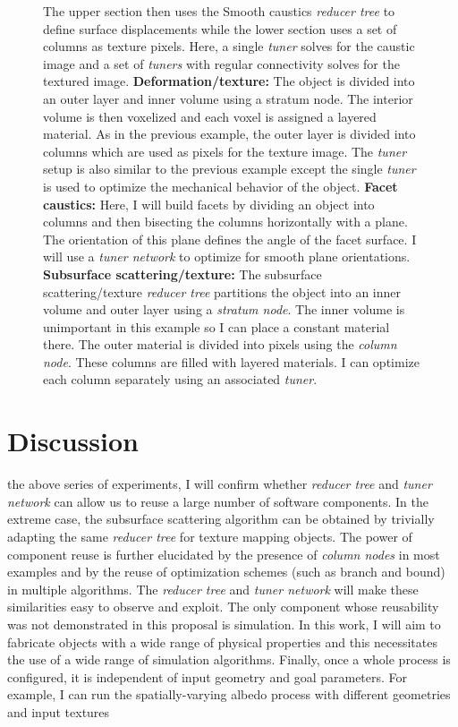 \begin{figure}[t]
{The upper section then uses the Smooth caustics \emph{reducer tree} to define surface displacements while the lower section uses a set of columns as texture pixels.
Here, a single \emph{tuner} solves for the caustic image and a set of \emph{tuners} with regular connectivity solves for the textured image.
\textbf{Deformation/texture:} The object is divided into an outer layer and inner volume using a stratum node.
The interior volume is then voxelized and each voxel is assigned a layered material.
As in the previous example, the outer layer is divided into columns which are used as pixels for the texture image.
The \emph{tuner} setup is also similar to the previous example except the single \emph{tuner} is used to optimize the mechanical behavior of the object.
\textbf{Facet caustics:} Here, I will build facets by dividing an object into columns and then bisecting the columns horizontally with a plane.
The orientation of this plane defines the angle of the facet surface. 
I will use a \emph{tuner network} to optimize for smooth plane orientations.
\textbf{Subsurface scattering/texture:} The subsurface scattering/texture \emph{reducer tree} partitions the object into an inner volume and outer layer using a \emph{stratum node}.
The inner volume is unimportant in this example so I  can place a constant material there.
The outer material is divided into pixels using the \emph{column node}.
These columns are filled with layered materials.
I can optimize each column separately using an associated \emph{tuner}.}
\label{fig:ReducerTreesAdditional}
\end{figure}

\chapter{Discussion}
 the above series of experiments, I will confirm whether \emph{reducer tree} and \emph{tuner network} can allow us to reuse a large number of software components.
In the extreme case, the subsurface scattering algorithm can be obtained by trivially adapting the same \emph{reducer tree} for texture mapping objects.
The power of component reuse is further elucidated by the presence of \emph{column nodes} in most examples and by the reuse of optimization schemes (such as branch and bound) in multiple algorithms.
The \emph{reducer tree} and \emph{tuner network} will make these similarities easy to observe and exploit.
The only component whose reusability was not demonstrated in this proposal is simulation.
In this work, I will aim to fabricate objects with a wide range of physical properties and this necessitates the use of a wide range of simulation algorithms. Finally, once a whole process is configured, it is independent of input geometry and goal parameters. For example, I can run the spatially-varying albedo process with different geometries and input textures


